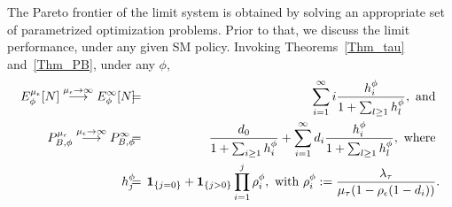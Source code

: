 The Pareto frontier of the limit system is obtained by solving an
appropriate set of parametrized optimization problems.  Prior to that,
we discuss the limit performance, under any
given SM policy. Invoking Theorems~\ref{Thm_tau}
and~\ref{Thm_PB}, under any $\phi$, 
\begin{eqnarray}
\label{Eqn_EN}
E^{\mu_\epsilon}_\phi[N]    \stackrel{\mu_\epsilon \to \infty }{ \longrightarrow}  E^{\infty}_\phi[N]  \hspace{-1mm}&  \hspace{-1mm} = \hspace{-1mm}&  \hspace{-1mm}\sum_{i = 1}^\infty   i \frac{ \h^\phi_i }{1 + \sum_{l\ge 1} \h^\phi_l},  \mbox{ and } \\
\label{Eqn_PB_under_phi}
P_{B, \phi}^{\mu_\epsilon}  \stackrel{\mu_\epsilon \to \infty }{ \longrightarrow}    P^\infty_{B, \phi}  \hspace{-1mm}&  \hspace{-1mm} = \hspace{-1mm}&  \hspace{-1mm} \frac{d_0}{1 + \sum_{i \ge 1}  \h^\phi_i } +  \sum_{i=1}^\infty d_i  
\frac{ \h^\phi_i}{1  + \sum_{l \ge 1} \h_l^\phi}, \mbox{ where }
%
\\ 
\label{Eqn_pi_under_phi}
   \h^\phi_j  \hspace{-1mm}&  \hspace{-1mm} = \hspace{-1mm}&  \hspace{-1mm}  \indicator{j = 0} + \indicator{j >0} \prod_{i=1}^j \rho^\phi_i
   , \ \mbox{with } \rho^\phi_i := \frac { \lambda_\tau }{\mu_\tau (1
     - \rho_\epsilon (1-d_i) )}.
\end{eqnarray}

%
 
 \vspace{-4mm}
